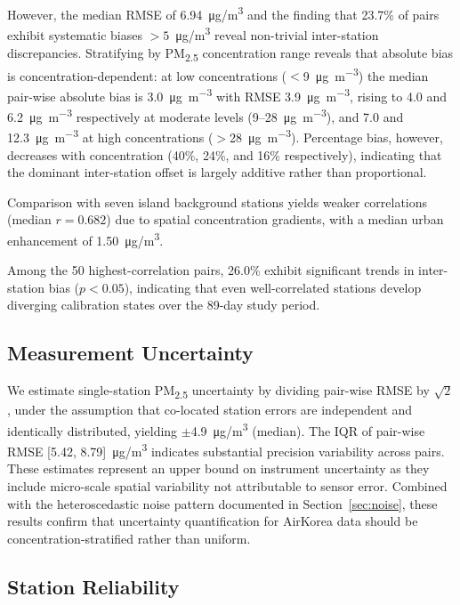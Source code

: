 \documentclass[12pt]{article}
\begin{document}
However, the median RMSE of 6.94~\si{\micro\gram/\meter\cubed} and the finding that 23.7\% of pairs exhibit systematic biases ${>}5$~\si{\micro\gram/\meter\cubed} reveal non-trivial inter-station discrepancies. Stratifying by PM\textsubscript{2.5} concentration range reveals that absolute bias is concentration-dependent: at low concentrations ($<$9~\si{\micro\gram\per\meter\cubed}) the median pair-wise absolute bias is 3.0~\si{\micro\gram\per\meter\cubed} with RMSE 3.9~\si{\micro\gram\per\meter\cubed}, rising to 4.0 and 6.2~\si{\micro\gram\per\meter\cubed} respectively at moderate levels (9--28~\si{\micro\gram\per\meter\cubed}), and 7.0 and 12.3~\si{\micro\gram\per\meter\cubed} at high concentrations ($>$28~\si{\micro\gram\per\meter\cubed}). Percentage bias, however, decreases with concentration (40\%, 24\%, and 16\% respectively), indicating that the dominant inter-station offset is largely additive rather than proportional.

Comparison with seven island background stations yields weaker correlations (median $r = 0.682$) due to spatial concentration gradients, with a median urban enhancement of 1.50~\si{\micro\gram/\meter\cubed}.

Among the 50 highest-correlation pairs, 26.0\% exhibit significant trends in inter-station bias ($p < 0.05$), indicating that even well-correlated stations develop diverging calibration states over the 89-day study period.

\subsection{Measurement Uncertainty}

We estimate single-station PM\textsubscript{2.5} uncertainty by dividing pair-wise RMSE by $\sqrt{2}$, under the assumption that co-located station errors are independent and identically distributed, yielding $\pm$\SI{4.9}{\micro\gram/\meter\cubed} (median). The IQR of pair-wise RMSE [\num{5.42}, \num{8.79}]~\si{\micro\gram/\meter\cubed} indicates substantial precision variability across pairs. These estimates represent an upper bound on instrument uncertainty as they include micro-scale spatial variability not attributable to sensor error. Combined with the heteroscedastic noise pattern documented in Section~\ref{sec:noise}, these results confirm that uncertainty quantification for AirKorea data should be concentration-stratified rather than uniform.

\subsection{Station Reliability}
\end{document}

